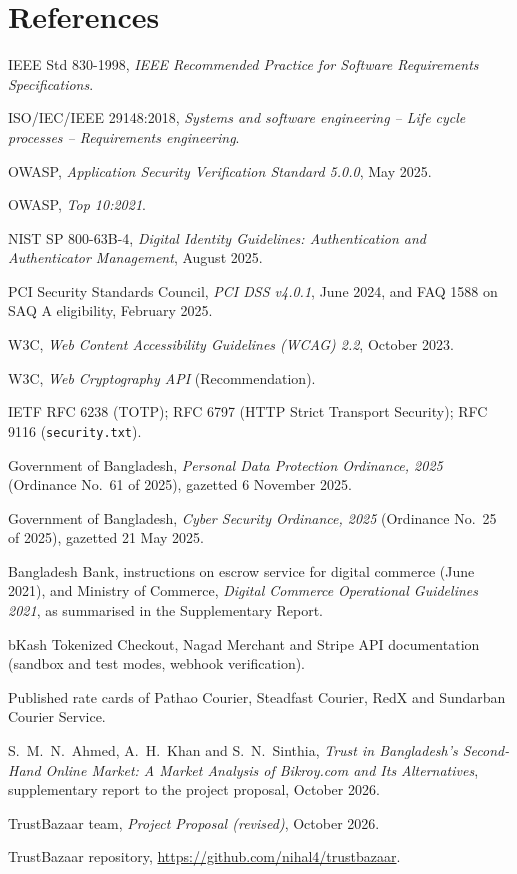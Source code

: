\documentclass[11pt,a4paper]{report}
\begin{document}
\section{References}
{\sloppy
\begin{enumerate}[label={[R\arabic*]}, nosep, leftmargin=*]
    \item IEEE Std 830-1998, \emph{IEEE Recommended Practice for Software Requirements Specifications}.
    \item ISO/IEC/IEEE 29148:2018, \emph{Systems and software engineering -- Life cycle processes -- Requirements engineering}.
    \item OWASP, \emph{Application Security Verification Standard 5.0.0}, May 2025.
    \item OWASP, \emph{Top 10:2021}.
    \item NIST SP 800-63B-4, \emph{Digital Identity Guidelines: Authentication and Authenticator Management}, August 2025.
    \item PCI Security Standards Council, \emph{PCI DSS v4.0.1}, June 2024, and FAQ 1588 on SAQ A eligibility, February 2025.
    \item W3C, \emph{Web Content Accessibility Guidelines (WCAG) 2.2}, October 2023.
    \item W3C, \emph{Web Cryptography API} (Recommendation).
    \item IETF RFC 6238 (TOTP); RFC 6797 (HTTP Strict Transport Security); RFC 9116 (\texttt{security.txt}).
    \item Government of Bangladesh, \emph{Personal Data Protection Ordinance, 2025} (Ordinance No.~61 of 2025), gazetted 6 November 2025.
    \item Government of Bangladesh, \emph{Cyber Security Ordinance, 2025} (Ordinance No.~25 of 2025), gazetted 21 May 2025.
    \item Bangladesh Bank, instructions on escrow service for digital commerce (June 2021), and Ministry of Commerce, \emph{Digital Commerce Operational Guidelines 2021}, as summarised in the Supplementary Report.
    \item bKash Tokenized Checkout, Nagad Merchant and Stripe API documentation (sandbox and test modes, webhook verification).
    \item Published rate cards of Pathao Courier, Steadfast Courier, RedX and Sundarban Courier Service.
    \item S.~M.~N.~Ahmed, A.~H.~Khan and S.~N.~Sinthia, \emph{Trust in Bangladesh's Second-Hand Online Market: A Market Analysis of Bikroy.com and Its Alternatives}, supplementary report to the project proposal, October 2026.
    \item TrustBazaar team, \emph{Project Proposal (revised)}, October 2026.
    \item TrustBazaar repository, \url{https://github.com/nihal4/trustbazaar}.
\end{enumerate}
}
\end{document}
